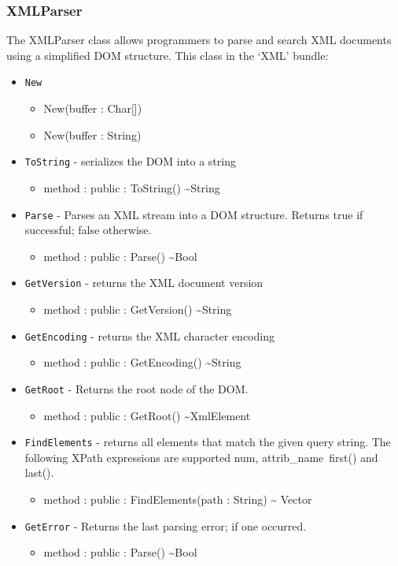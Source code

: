 \documentclass[11pt]{article}
\begin{document}
\subsubsection{XMLParser}
The XMLParser class allows programmers to parse and search XML
documents using a simplified DOM structure.  This class in the `XML'
bundle:
\begin{itemize}
\item \texttt{New}
  \begin{itemize}
  \item New(buffer : Char[])
  \item New(buffer : String)
  \end{itemize}
\item \texttt{ToString} - serializes the DOM into a string
  \begin{itemize}
  \item method : public : ToString() \textasciitilde String
  \end{itemize}
\item \texttt{Parse} - Parses an XML stream into a DOM structure.
  Returns true if successful; false otherwise.
  \begin{itemize}
  \item method : public : Parse() \textasciitilde Bool
  \end{itemize}
\item \texttt{GetVersion} - returns the XML document version
  \begin{itemize}
  \item method : public : GetVersion() \textasciitilde String
  \end{itemize}
\item \texttt{GetEncoding} - returns the XML character encoding
  \begin{itemize}
  \item method : public : GetEncoding() \textasciitilde String
  \end{itemize}
\item \texttt{GetRoot} - Returns the root node of the DOM.
  \begin{itemize}
  \item method : public : GetRoot() \textasciitilde XmlElement
  \end{itemize}
\item \texttt{FindElements} - returns all elements that match the
  given query string.  The following XPath expressions are supported
  num, attrib\_name\, first() and last().
  \begin{itemize}
  \item method : public : FindElements(path : String) \textasciitilde
    Vector
  \end{itemize}
\item \texttt{GetError} - Returns the last parsing error; if one
  occurred.
  \begin{itemize}
  \item method : public : Parse() \textasciitilde Bool
  \end{itemize}
\end{itemize}
\end{document}
